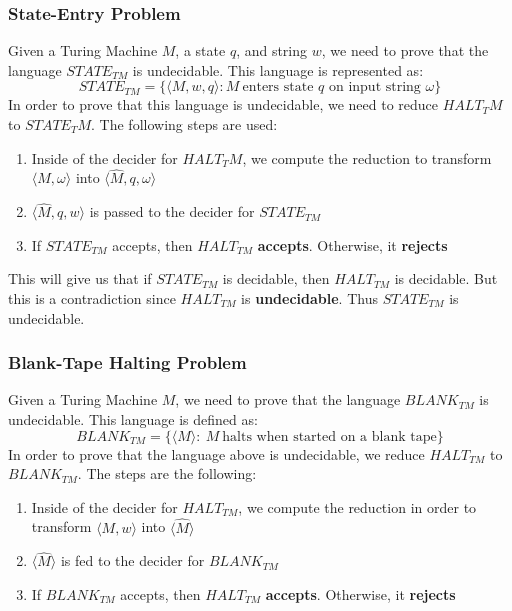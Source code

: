 \documentclass{article}
\begin{document}
\subsubsection{State-Entry Problem}
Given a Turing Machine $M$, a state $q$, and string $w$, we need to prove that the language $STATE_{TM}$ is undecidable. This language is represented as:
\[ STATE_{TM} = \{ \langle M, w, q \rangle : M~\text{enters state $q$ on input string $\omega$} \} \]
In order to prove that this language is undecidable, we need to reduce $HALT_TM$ to $STATE_TM$. The following steps are used:

\begin{enumerate}
	\item Inside of the decider for $HALT_TM$, we compute the reduction to transform $\langle M, \omega \rangle$ into $\langle \hat M, q, \omega \rangle$
	\item $\langle \hat M, q, w \rangle$ is passed to the decider for $STATE_{TM}$
    \item If $STATE_{TM}$ accepts, then $HALT_{TM}$ \textbf{accepts}. Otherwise, it \textbf{rejects}
\end{enumerate}
This will give us that if $STATE_{TM}$ is decidable, then $HALT_{TM}$ is decidable. But this is a contradiction since $HALT_{TM}$ is \textbf{undecidable}. Thus $STATE_{TM}$ is undecidable.

\subsubsection{Blank-Tape Halting Problem}
Given a Turing Machine $M$, we need to prove that the language $BLANK_{TM}$ is undecidable. This language is defined as:
\[ BLANK_{TM} = \{ \langle M \rangle:~M~\text{halts when started on a blank tape} \} \]
In order to prove that the language above is undecidable, we reduce $HALT_{TM}$ to $BLANK_{TM}$. The steps are the following:

\begin{enumerate}
	\item Inside of the decider for $HALT_{TM}$, we compute the reduction in order to transform $\langle M, w \rangle$ into $\langle \hat M \rangle$
	\item $\langle \hat M \rangle$ is fed to the decider for $BLANK_{TM}$
	\item If $BLANK_{TM}$ accepts, then $HALT_{TM}$ \textbf{accepts}. Otherwise, it \textbf{rejects}
\end{enumerate}
\end{document}

